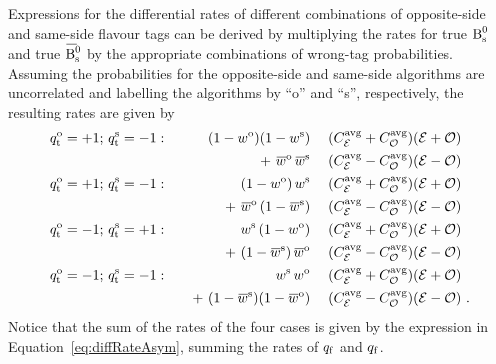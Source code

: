 Expressions for the differential rates of different combinations of opposite-side and same-side flavour tags can be derived by multiplying
the rates for true $\text{B}_\text{s}^\text{0}$ and true $\Bsbar$ by the appropriate combinations of wrong-tag probabilities. Assuming the probabilities for the
opposite-side and same-side algorithms are uncorrelated and labelling the algorithms by ``o'' and ``s'', respectively, the resulting
rates are given by
\begin{alignat}{3}
  \label{eq:diffRateWTag}
  \qtOS=+1;\, \qtSS=-1:  &\quad&  (1-\wTagOS)(1-\wTagSS)           &\;& (\avgCEven+\avgCOdd)(\even+\odd) & \nonumber\\*
                         &     &  +\ \wTagBarOS\, \wTagBarSS       &  & (\avgCEven-\avgCOdd)(\even-\odd) & \nonumber\\
  \qtOS=+1;\, \qtSS=-1:  &     &  (1-\wTagOS)\, \wTagSS            &  & (\avgCEven+\avgCOdd)(\even+\odd) & \nonumber\\*
                         &     &  +\ \wTagBarOS\, (1-\wTagBarSS)   &  & (\avgCEven-\avgCOdd)(\even-\odd) & \nonumber\\
  \qtOS=-1;\, \qtSS=+1:  &     &  \wTagSS\, (1-\wTagOS)            &  & (\avgCEven+\avgCOdd)(\even+\odd) &          \\*
                         &     &  +\ (1-\wTagBarSS)\, \wTagBarOS   &  & (\avgCEven-\avgCOdd)(\even-\odd) & \nonumber\\
  \qtOS=-1;\, \qtSS=-1:  &     &  \wTagSS\, \wTagOS                &  & (\avgCEven+\avgCOdd)(\even+\odd) & \nonumber\\*
                         &     &  +\ (1-\wTagBarSS)(1-\wTagBarOS)  &  & (\avgCEven-\avgCOdd)(\even-\odd) & \nonumber\ .
\end{alignat}
Notice that the sum of the rates of the four cases is given by the expression in Equation~\ref{eq:diffRateAsym}, summing the rates of
${q_\mathrm{f}}$\texteq{} and ${q_\mathrm{f}}$\texteq{}.


